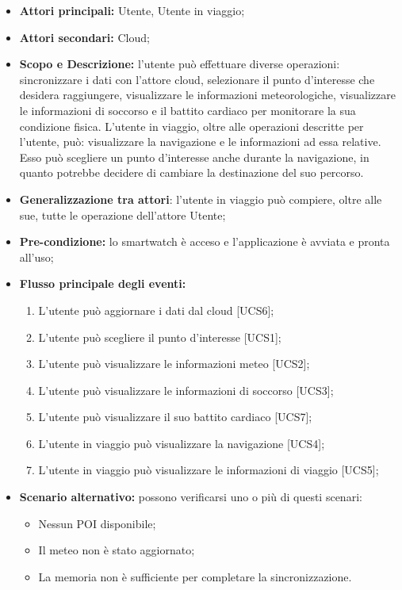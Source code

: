 \begin{itemize}
\item \textbf{Attori principali:} Utente, Utente in viaggio;
\item \textbf{Attori secondari:} Cloud;
\item \textbf{Scopo e Descrizione:} l'utente può effettuare diverse operazioni: sincronizzare i dati con l'attore cloud, selezionare il punto d'interesse che desidera raggiungere, visualizzare le informazioni meteorologiche, visualizzare le informazioni di soccorso e il battito cardiaco per monitorare la sua condizione fisica. L'utente in viaggio, oltre alle operazioni descritte per l'utente, può: visualizzare la navigazione e le informazioni ad essa relative. Esso può scegliere un punto d'interesse anche durante la navigazione, in quanto potrebbe decidere di cambiare la destinazione del suo percorso. 
\item \textbf{Generalizzazione tra attori}: l'utente in viaggio può compiere, oltre alle sue, tutte le operazione dell'attore Utente;
\item \textbf{Pre-condizione:} lo smartwatch è acceso e l'applicazione è avviata e pronta all'uso;
\item \textbf{Flusso principale degli eventi:}
\begin{enumerate}
\item L'utente può aggiornare i dati dal cloud [UCS6];
\item L'utente può scegliere il punto d'interesse [UCS1];
\item L'utente può visualizzare le informazioni meteo [UCS2];
\item L'utente può visualizzare le informazioni di soccorso [UCS3];
\item L'utente può visualizzare il suo battito cardiaco [UCS7];
\item L'utente in viaggio può visualizzare la navigazione [UCS4];
\item L'utente in viaggio può visualizzare le informazioni di viaggio [UCS5];
\end{enumerate}
\item \textbf{Scenario alternativo:} possono verificarsi uno o più di questi scenari:
\begin{itemize}
\item Nessun POI disponibile;
\item Il meteo non è stato aggiornato;
\item La memoria non è sufficiente per completare la sincronizzazione.
\end{itemize}

\end{itemize}
